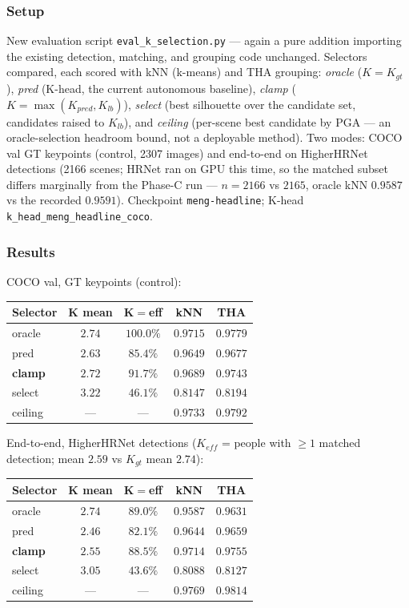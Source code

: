 \subsubsection{Setup}

New evaluation script \texttt{eval\_k\_selection.py} --- again a pure addition importing the existing detection, matching, and grouping code unchanged. Selectors compared, each scored with kNN (k-means) and THA grouping: \emph{oracle} ($K = K_{gt}$), \emph{pred} (K-head, the current autonomous baseline), \emph{clamp} ($K = \max(K_{pred}, K_{lb})$), \emph{select} (best silhouette over the candidate set, candidates raised to $K_{lb}$), and \emph{ceiling} (per-scene best candidate by PGA --- an oracle-selection headroom bound, not a deployable method). Two modes: COCO val GT keypoints (control, 2307 images) and end-to-end on HigherHRNet detections (2166 scenes; HRNet ran on GPU this time, so the matched subset differs marginally from the Phase-C run --- $n\!=\!2166$ vs $2165$, oracle kNN $0.9587$ vs the recorded $0.9591$). Checkpoint \texttt{meng-headline}; K-head \texttt{k\_head\_meng\_headline\_coco}.

\subsubsection{Results}

COCO val, GT keypoints (control):

\begin{tabular}{lcccc}
\hline
\textbf{Selector} & \textbf{K mean} & \textbf{K$=$eff} & \textbf{kNN} & \textbf{THA} \\
\hline
oracle  & $2.74$ & $100.0\%$ & $0.9715$ & $0.9779$ \\
pred    & $2.63$ & $85.4\%$  & $0.9649$ & $0.9677$ \\
\textbf{clamp} & $2.72$ & $\mathbf{91.7\%}$ & $\mathbf{0.9689}$ & $\mathbf{0.9743}$ \\
select  & $3.22$ & $46.1\%$  & $0.8147$ & $0.8194$ \\
ceiling & ---    & ---       & $0.9733$ & $0.9792$ \\
\hline
\end{tabular}

\vspace{0.5em}

End-to-end, HigherHRNet detections ($K_{eff}$ = people with $\geq 1$ matched detection; mean $2.59$ vs $K_{gt}$ mean $2.74$):

\begin{tabular}{lcccc}
\hline
\textbf{Selector} & \textbf{K mean} & \textbf{K$=$eff} & \textbf{kNN} & \textbf{THA} \\
\hline
oracle  & $2.74$ & $89.0\%$ & $0.9587$ & $0.9631$ \\
pred    & $2.46$ & $82.1\%$ & $0.9644$ & $0.9659$ \\
\textbf{clamp} & $2.55$ & $\mathbf{88.5\%}$ & $\mathbf{0.9714}$ & $\mathbf{0.9755}$ \\
select  & $3.05$ & $43.6\%$ & $0.8088$ & $0.8127$ \\
ceiling & ---    & ---      & $0.9769$ & $0.9814$ \\
\hline
\end{tabular}

